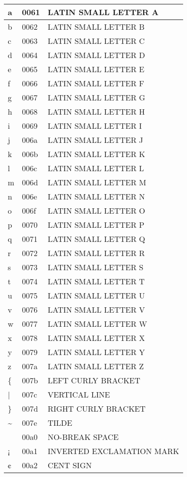 \documentclass[12pt,letterpaper,openany]{book}
\begin{document}
\begin{center}
\begin{supertabular}{|m{0.25in}|m{0.5in}|m{4in}|}
a & 0061 & LATIN SMALL LETTER A\\\hline
b & 0062 & LATIN SMALL LETTER B\\\hline
c & 0063 & LATIN SMALL LETTER C\\\hline
d & 0064 & LATIN SMALL LETTER D\\\hline
e & 0065 & LATIN SMALL LETTER E\\\hline
f & 0066 & LATIN SMALL LETTER F\\\hline
g & 0067 & LATIN SMALL LETTER G\\\hline
h & 0068 & LATIN SMALL LETTER H\\\hline
i & 0069 & LATIN SMALL LETTER I\\\hline
j & 006a & LATIN SMALL LETTER J\\\hline
k & 006b & LATIN SMALL LETTER K\\\hline
l & 006c & LATIN SMALL LETTER L\\\hline
m & 006d & LATIN SMALL LETTER M\\\hline
n & 006e & LATIN SMALL LETTER N\\\hline
o & 006f & LATIN SMALL LETTER O\\\hline
p & 0070 & LATIN SMALL LETTER P\\\hline
q & 0071 & LATIN SMALL LETTER Q\\\hline
r & 0072 & LATIN SMALL LETTER R\\\hline
s & 0073 & LATIN SMALL LETTER S\\\hline
t & 0074 & LATIN SMALL LETTER T\\\hline
u & 0075 & LATIN SMALL LETTER U\\\hline
v & 0076 & LATIN SMALL LETTER V\\\hline
w & 0077 & LATIN SMALL LETTER W\\\hline
x & 0078 & LATIN SMALL LETTER X\\\hline
y & 0079 & LATIN SMALL LETTER Y\\\hline
z & 007a & LATIN SMALL LETTER Z\\\hline
\{ & 007b & LEFT CURLY BRACKET\\\hline
| & 007c & VERTICAL LINE\\\hline
\} & 007d & RIGHT CURLY BRACKET\\\hline
\textasciitilde & 007e & TILDE\\\hline
& 00a0 & NO-BREAK SPACE\\\hline
¡ & 00a1 & INVERTED EXCLAMATION MARK\\\hline
¢ & 00a2 & CENT SIGN\\\hline

\end{supertabular}
\end{center}
\end{document}
